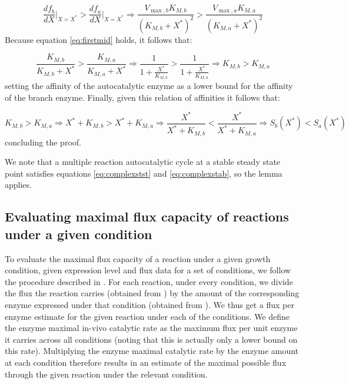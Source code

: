      \begin{equation*}
        \frac{df_b}{dX}\Big\vert_{X=X^*}>\frac{df_a}{dX}\Big\vert_{X=X^*} \Rightarrow
        \frac{V_{\max,b}K_{M,b}}{(K_{M,b}+X^*)^2} > \frac{V_{\max,a}K_{M,a}}{(K_{M,a}+X^*)^2}
     \end{equation*}
     Because equation \ref{eq:firstmid} holds, it follows that:

     \begin{equation*}
         \frac{K_{M,b}}{K_{M,b}+X^*} > \frac{K_{M,a}}{K_{M,a}+X^*} \Rightarrow \frac{1}{1+\frac{X^*}{K_{M,b}}} > \frac{1}{1+\frac{X^*}{K_{M,a}}} \Rightarrow K_{M,b}>K_{M,a}
     \end{equation*}
    setting the affinity of the autocatalytic enzyme as a lower bound for the affinity of the branch enzyme.
    Finally, given this relation of affinities it follows that:

    \begin{equation*}
        K_{M,b}>K_{M,a} \Rightarrow X^*+K_{M,b}>X^*+K_{M,a} \Rightarrow \frac{X^*}{X^*+K_{M,b}}<\frac{X^*}{X^*+K_{M,a} } \Rightarrow S_b(X^*)<S_a(X^*)
    \end{equation*}
    concluding the proof.

    We note that a multiple reaction autocatalytic cycle at a stable steady state point satisfies equations \ref{eq:complexstst} and \ref{eq:complexstab}, so the lemma applies.

    \subsection{Evaluating maximal flux capacity of reactions under a given condition}
    To evaluate the maximal flux capacity of a reaction under a given growth condition, given expression level and flux data for a set of conditions, we follow the procedure described in \cite{Davidi2016-ga}.
    For each reaction, under every condition, we divide the flux the reaction carries (obtained from \cite{Gerosa2015-oq}) by the amount of the corresponding enzyme expressed under that condition (obtained from \cite{Schmidt2015}).
    We thus get a flux per enzyme estimate for the given reaction under each of the conditions.
    We define the enzyme maximal in-vivo catalytic rate as the maximum flux per unit enzyme it carries across all conditions (noting that this is actually only a lower bound on this rate).
    Multiplying the enzyme maximal catalytic rate by the enzyme amount at each condition therefore results in an estimate of the maximal possible flux through the given reaction under the relevant condition.
